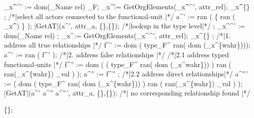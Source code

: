 {\begin{algorithm}[GetAT]
\begin{program}
			{\rel_x^\f}^{'} := dom(\rel_{Name} \rhd rel) \cap \relmengebenutzerinstOE_F; \label{alg:GetAT:FF}
			\rel_x^\f := GetOrgElements({\rel_x^\f}^{'}, attr_{rel});
			\IF \rel_x^\f \neq \{\}
			\THEN
				\var {};
				/*|select all actors connected to the functional-unit |*/
				a^{'} := ran \left( \{ ran \left( \rel_x^\f \right) \} \lhd \relstrukturFA \right);
				\RETURN \quad |GetAT|(a^{'}, attr_a, \{\},\{\});
			\ELSE /*|lookup in the  type level|*/
			\var {};
			{\rel_x^\ftyp}^{'} := dom(\rel_{Name} \rhd rel) \cap \typbenutzerrelationenmenge; \label{alg:GetAT:FtFt}
			\rel_x^\ftyp := GetOrgElements({\rel_x^\ftyp}^{'}, attr_{rel});
			\IF \rel_x^\ftyp \neq \{\} 
			\THEN
				\var {};
				/*|1. address all true relationships |*/ \label{alg:GetAT:PraedikateStart} \label{alg:GetAT:WahrePraedikate}
				f^{'} := dom \bigl( type_F^{\typsymbol} \rhd ran( dom (\rel_x^\ftyp \rhd \{wahr\}))\bigr);
				a^{'} := ran \bigl( f^{'} \lhd \relstrukturFA \bigr);
				/*|2. address false relationships |*/\label{alg:GetAT:NichtWahrePraedikate}
				/*|2.1 address typed functional-units |*/
				f^{''} := dom \bigl( \bigl( type_F^{\typsymbol} \rhd ran( dom (\rel_x^\ftyp \rrhd wahr\})) \bigr) 
				\cap 
				ran \bigl( ran(\rel_x^\ftyp \rrhd \{wahr\}) \lhd \rel_{val} \bigr) \bigr); 
				a^{''} := f^{''} \lhd \relstrukturFA;
				/*|2.2 address direct relationships|*/
			a^{'''} := 
				\bigl( dom \bigl( type_F^{\typsymbol} \rhd ran( dom (\rel_x^\ftyp \rrhd \{wahr\})) \lhd \relstrukturFA \bigr)
				  \cap ran \bigl(  ran(\rel_x^\ftyp \rrhd \{wahr\}) \lhd \rel_{val} \bigr) \bigr); 
				\RETURN \quad |GetAT|(a^{'} \cup a^{''} \cup a^{'''}, attr_a, \{\},\{\}); \label{alg:GetAT:PraedikateStop}
			\ELSE
				/*| no corresponding relationship found |*/
				
				\RETURN \quad \{\};
			\FI
		\FI
	\FI
	\FI
	\END
	\end{program}
	\end{algorithm}
	\NumberProgramsfalse
	}

